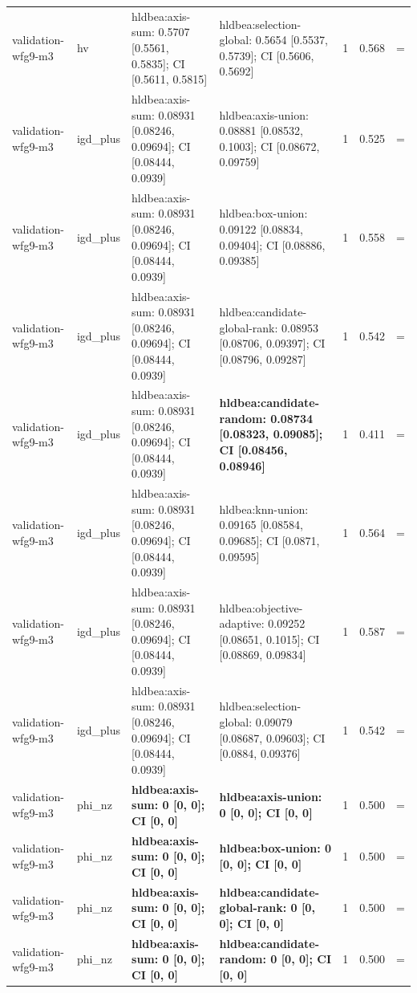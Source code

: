 \begin{tabular}{llllrrc}
validation-wfg9-m3 & hv & hldbea:axis-sum: 0.5707 [0.5561, 0.5835]; CI [0.5611, 0.5815] & hldbea:selection-global: 0.5654 [0.5537, 0.5739]; CI [0.5606, 0.5692] & 1 & 0.568 & = \\
validation-wfg9-m3 & igd\_plus & hldbea:axis-sum: 0.08931 [0.08246, 0.09694]; CI [0.08444, 0.0939] & hldbea:axis-union: 0.08881 [0.08532, 0.1003]; CI [0.08672, 0.09759] & 1 & 0.525 & = \\
validation-wfg9-m3 & igd\_plus & hldbea:axis-sum: 0.08931 [0.08246, 0.09694]; CI [0.08444, 0.0939] & hldbea:box-union: 0.09122 [0.08834, 0.09404]; CI [0.08886, 0.09385] & 1 & 0.558 & = \\
validation-wfg9-m3 & igd\_plus & hldbea:axis-sum: 0.08931 [0.08246, 0.09694]; CI [0.08444, 0.0939] & hldbea:candidate-global-rank: 0.08953 [0.08706, 0.09397]; CI [0.08796, 0.09287] & 1 & 0.542 & = \\
validation-wfg9-m3 & igd\_plus & hldbea:axis-sum: 0.08931 [0.08246, 0.09694]; CI [0.08444, 0.0939] & \textbf{hldbea:candidate-random: 0.08734 [0.08323, 0.09085]; CI [0.08456, 0.08946]} & 1 & 0.411 & = \\
validation-wfg9-m3 & igd\_plus & hldbea:axis-sum: 0.08931 [0.08246, 0.09694]; CI [0.08444, 0.0939] & hldbea:knn-union: 0.09165 [0.08584, 0.09685]; CI [0.0871, 0.09595] & 1 & 0.564 & = \\
validation-wfg9-m3 & igd\_plus & hldbea:axis-sum: 0.08931 [0.08246, 0.09694]; CI [0.08444, 0.0939] & hldbea:objective-adaptive: 0.09252 [0.08651, 0.1015]; CI [0.08869, 0.09834] & 1 & 0.587 & = \\
validation-wfg9-m3 & igd\_plus & hldbea:axis-sum: 0.08931 [0.08246, 0.09694]; CI [0.08444, 0.0939] & hldbea:selection-global: 0.09079 [0.08687, 0.09603]; CI [0.0884, 0.09376] & 1 & 0.542 & = \\
validation-wfg9-m3 & phi\_nz & \textbf{hldbea:axis-sum: 0 [0, 0]; CI [0, 0]} & \textbf{hldbea:axis-union: 0 [0, 0]; CI [0, 0]} & 1 & 0.500 & = \\
validation-wfg9-m3 & phi\_nz & \textbf{hldbea:axis-sum: 0 [0, 0]; CI [0, 0]} & \textbf{hldbea:box-union: 0 [0, 0]; CI [0, 0]} & 1 & 0.500 & = \\
validation-wfg9-m3 & phi\_nz & \textbf{hldbea:axis-sum: 0 [0, 0]; CI [0, 0]} & \textbf{hldbea:candidate-global-rank: 0 [0, 0]; CI [0, 0]} & 1 & 0.500 & = \\
validation-wfg9-m3 & phi\_nz & \textbf{hldbea:axis-sum: 0 [0, 0]; CI [0, 0]} & \textbf{hldbea:candidate-random: 0 [0, 0]; CI [0, 0]} & 1 & 0.500 & = \\

\end{tabular}
